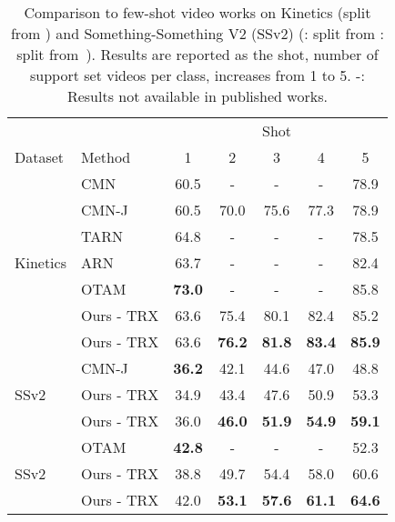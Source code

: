 \documentclass[final]{cvpr}
\begin{document}
\begin{table*}
\small
\begin{tabular}{llccccc}
\toprule 
&    & \multicolumn{5}{c}{Shot} \\
\cmidrule(){3-7}
Dataset \hspace{3mm} &   Method  \hspace{15mm}    &  \hspace{3mm} 1 \hspace{3mm}  &  \hspace{3mm} 2 \hspace{3mm}  &  \hspace{3mm} 3 \hspace{3mm}    &  \hspace{3mm} 4 \hspace{3mm}    &  \hspace{3mm} 5 \hspace{3mm}   \\ 
\midrule
&    CMN \cite{Zhu2018}       & 60.5  & -  & -  & -  & 78.9  \\ 
           &    CMN-J \cite{Zhu2020}      &  60.5   &    70.0   &    75.6   &    77.3   &    78.9   \\
           &    TARN \cite{Bishay2019}       & 64.8  & -  & -  & -  & 78.5  \\ 
Kinetics   &    ARN \cite{Zhang2020}       & 63.7  & -  & -  & -  & 82.4  \\ 
           &    OTAM \cite{Cao2020}       & \textbf{73.0}  & -  & -  & -  & 85.8  \\ 
           &    Ours - TRX        & 63.6  & 75.4  & 80.1  & 82.4  & 85.2  \\ 
           &    Ours - TRX        & 63.6  & \textbf{76.2}  & \textbf{81.8}  & \textbf{83.4}  & \textbf{85.9}  \\ 
\midrule
                    &     CMN-J \cite{Zhu2020}     &  \bf{36.2}   &    42.1   &    44.6   &    47.0   &    48.8   \\
SSv2 &    Ours - TRX        &    34.9  & 43.4   &    47.6   &    50.9   &    53.3   \\ 
                    &    Ours - TRX        &  36.0   &  \textbf{46.0}   &  \textbf{51.9}   &    \textbf{54.9}   &    \textbf{59.1}   \\
\midrule
                    &    OTAM \cite{Cao2020}       & \textbf{42.8}  & -  & -  & -  & 52.3  \\ 
SSv2 &    Ours - TRX        & 38.8     & 49.7   & 54.4     & 58.0      & 60.6      \\ 
                    &    Ours - TRX        &  42.0   &  \textbf{53.1}   &  \textbf{57.6}   &    \textbf{61.1}   &    \textbf{64.6}   \\
\bottomrule
\end{tabular}
\caption{Comparison to few-shot video works on Kinetics (split from \cite{Zhu2020}) and Something-Something V2 (SSv2) (: split from \cite{Zhu2020}  : split from~\cite{Cao2020}). Results are reported as the shot, \ie number of support set videos per class, increases from 1 to 5.  -: Results not available in published works.
}
\label{tab:all_shots}
\end{table*}
\end{document}
